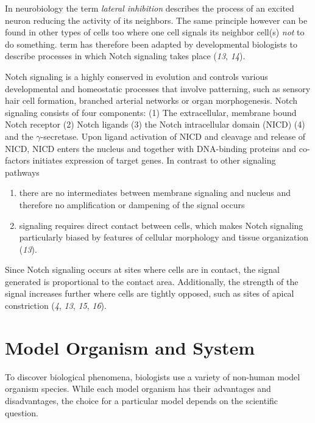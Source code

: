 \documentclass[11pt,singlespacinge,twoside]{reedthesis} %
\providecommand{\tightlist}{%
  \setlength{\itemsep}{0pt}\setlength{\parskip}{0pt}}
\begin{document}
In neurobiology the term \emph{lateral inhibition} describes the process of an excited neuron reducing the activity of its neighbors. The same principle however can be found in other types of cells too where one cell signals its neighbor cell(s) \emph{not} to do something. term has therefore been adapted by developmental biologists to describe processes in which Notch signaling takes place (\emph{13}, \emph{14}).

Notch signaling is a highly conserved in evolution and controls various developmental and homeostatic processes that involve patterning, such as sensory hair cell formation, branched arterial networks or organ morphogenesis. Notch signaling consists of four components: (1) The extracellular, membrane bound Notch receptor (2) Notch ligands (3) the Notch intracellular domain (NICD) (4) and the \(\gamma\)-secretase. Upon ligand activation of NICD and cleavage and release of NICD, NICD enters the nucleus and together with DNA-binding proteins and co-factors initiates expression of target genes. In contrast to other signaling pathways
\begin{enumerate}
\def\labelenumi{\arabic{enumi}.}
\tightlist
\item
  there are no intermediates between membrane signaling and nucleus and therefore no amplification or dampening of the signal occurs
\item
  signaling requires direct contact between cells, which makes Notch signaling particularly biased by features of cellular morphology and tissue organization (\emph{13}).
\end{enumerate}
Since Notch signaling occurs at sites where cells are in contact, the signal generated is proportional to the contact area. Additionally, the strength of the signal increases further where cells are tightly opposed, such as sites of apical constriction (\emph{4}, \emph{13}, \emph{15}, \emph{16}).

\hypertarget{model-organism-and-system}{%
\section{Model Organism and System}\label{model-organism-and-system}}

To discover biological phenomena, biologists use a variety of non-human model organism species. While each model organism has their advantages and disadvantages, the choice for a particular model depends on the scientific question.
\end{document}
